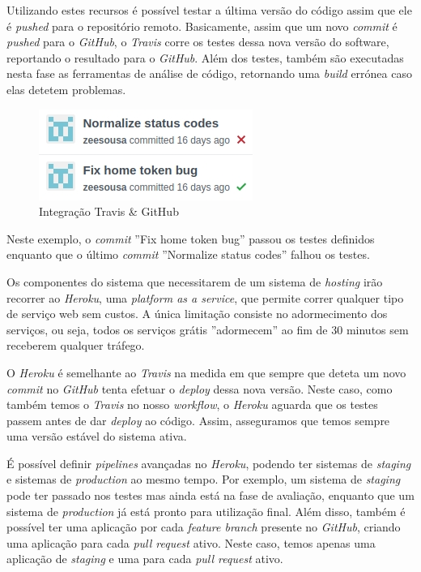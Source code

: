 Utilizando estes recursos é possível testar a última versão do código assim que ele é \textit{pushed} para o repositório remoto. Basicamente, assim que um novo \textit{commit} é \textit{pushed} para o \textit{GitHub}, o \textit{Travis} corre os testes dessa nova versão do software, reportando o resultado para o \textit{GitHub}. Além dos testes, também são executadas nesta fase as ferramentas de análise de código, retornando uma \textit{build} errónea caso elas detetem problemas.

\begin{figure}[H]
  \centering
        \includegraphics[scale=1]{img/github.jpg}
  \caption{Integração Travis \& GitHub}
\end{figure}

Neste exemplo, o \textit{commit} ''Fix home token bug'' passou os testes definidos enquanto que o último \textit{commit} ''Normalize status codes'' falhou os testes.

Os componentes do sistema que necessitarem de um sistema de \textit{hosting} irão recorrer ao \textit{Heroku}, uma \textit{platform as a service}, que permite correr qualquer tipo de serviço web sem custos. A única limitação consiste no adormecimento dos serviços, ou seja, todos os serviços grátis ''adormecem'' ao fim de 30 minutos sem receberem qualquer tráfego.

O \textit{Heroku} é semelhante ao \textit{Travis} na medida em que sempre que deteta um novo \textit{commit} no \textit{GitHub} tenta efetuar o \textit{deploy} dessa nova versão. Neste caso, como também temos o \textit{Travis} no nosso \textit{workflow}, o \textit{Heroku} aguarda que os testes passem antes de dar \textit{deploy} ao código. Assim, asseguramos que temos sempre uma versão estável do sistema ativa. 

É possível definir \textit{pipelines} avançadas no \textit{Heroku}, podendo ter sistemas de \textit{staging} e sistemas de \textit{production} ao mesmo tempo. Por exemplo, um sistema de \textit{staging} pode ter passado nos testes mas ainda está na fase de avaliação, enquanto que um sistema de \textit{production} já está pronto para utilização final. Além disso, também é possível ter uma aplicação por cada \textit{feature branch} presente no \textit{GitHub}, criando uma aplicação para cada \textit{pull request} ativo. Neste caso, temos apenas uma aplicação de \textit{staging} e uma para cada \textit{pull request} ativo.


